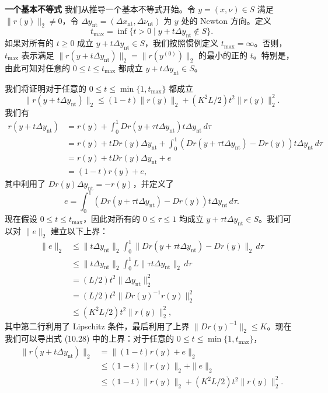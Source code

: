 \documentclass[UTF8, 12pt, fontset=fandol, oneside]{ctexart}
\begin{document}
\noindent\textbf{一个基本不等式}\quad
我们从推导一个基本不等式开始。令 $y=(x,\nu)\in S$ 满足 $\|r(y)\|_2\neq 0$，令 $\Delta y_{\mathrm{nt}}=(\Delta x_{\mathrm{nt}},\Delta\nu_{\mathrm{nt}})$ 为 $y$ 处的 Newton 方向。定义
\[
t_{\max}=\inf\{t>0\mid y+t\Delta y_{\mathrm{nt}}\notin S\}.
\]
如果对所有的 $t\geq 0$ 成立 $y+t\Delta y_{\mathrm{nt}}\in S$，我们按照惯例定义 $t_{\max}=\infty$。否则，$t_{\max}$ 表示满足 $\|r(y+t\Delta y_{\mathrm{nt}})\|_2=\|r(y^{(0)})\|_2$ 的最小的正的 $t$。特别是，由此可知对任意的 $0\leq t\leq t_{\max}$ 都成立 $y+t\Delta y_{\mathrm{nt}}\in S$。

我们将证明对于任意的 $0\leq t\leq \min\{1,t_{\max}\}$ 都成立
\begin{equation}
\|r(y+t\Delta y_{\mathrm{nt}})\|_2
\leq (1-t)\|r(y)\|_2+(K^2L/2)t^2\|r(y)\|_2^2.
\tag{10.28}
\end{equation}
我们有
\[
\begin{aligned}
r(y+t\Delta y_{\mathrm{nt}})
&=r(y)+\int_0^1 Dr(y+\tau t\Delta y_{\mathrm{nt}})t\Delta y_{\mathrm{nt}}\,d\tau\\
&=r(y)+tDr(y)\Delta y_{\mathrm{nt}}
  +\int_0^1(Dr(y+\tau t\Delta y_{\mathrm{nt}})-Dr(y))t\Delta y_{\mathrm{nt}}\,d\tau\\
&=r(y)+tDr(y)\Delta y_{\mathrm{nt}}+e\\
&=(1-t)r(y)+e,
\end{aligned}
\]
其中利用了 $Dr(y)\Delta y_{\mathrm{nt}}=-r(y)$，并定义了
\[
e=\int_0^1(Dr(y+\tau t\Delta y_{\mathrm{nt}})-Dr(y))t\Delta y_{\mathrm{nt}}\,d\tau.
\]
现在假设 $0\leq t\leq t_{\max}$，因此对所有的 $0\leq\tau\leq 1$ 均成立 $y+\tau t\Delta y_{\mathrm{nt}}\in S$。我们可以对 $\|e\|_2$ 建立以下上界：
\[
\begin{aligned}
\|e\|_2
&\leq \|t\Delta y_{\mathrm{nt}}\|_2
\int_0^1\|Dr(y+\tau t\Delta y_{\mathrm{nt}})-Dr(y)\|_2\,d\tau\\
&\leq \|t\Delta y_{\mathrm{nt}}\|_2
\int_0^1 L\|\tau t\Delta y_{\mathrm{nt}}\|_2\,d\tau\\
&=(L/2)t^2\|\Delta y_{\mathrm{nt}}\|_2^2\\
&=(L/2)t^2\|Dr(y)^{-1}r(y)\|_2^2\\
&\leq (K^2L/2)t^2\|r(y)\|_2^2,
\end{aligned}
\]
其中第二行利用了 Lipschitz 条件，最后利用了上界 $\|Dr(y)^{-1}\|_2\leq K$。现在我们可以导出式 (10.28) 中的上界：对于任意的 $0\leq t\leq \min\{1,t_{\max}\}$，
\[
\begin{aligned}
\|r(y+t\Delta y_{\mathrm{nt}})\|_2
&=\|(1-t)r(y)+e\|_2\\
&\leq (1-t)\|r(y)\|_2+\|e\|_2\\
&\leq (1-t)\|r(y)\|_2+(K^2L/2)t^2\|r(y)\|_2^2.
\end{aligned}
\]
\end{document}
